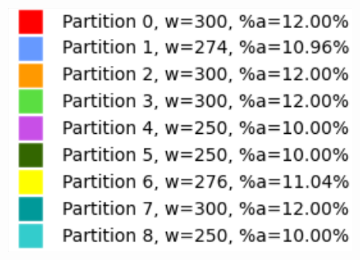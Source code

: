 \begin{figure}[h]
\centering
\begin{subfigure}{.33\textwidth}
    \centering
    \caption[short]{}
\end{subfigure}%
\begin{subfigure}{.33\textwidth}
    \centering
    \caption[short]{}
\end{subfigure}%
\begin{subfigure}{.33\textwidth}
    \centering
    \includegraphics[width=0.9\linewidth]{images/results/m_k/with/2/results}

\end{subfigure}
\end{figure}

